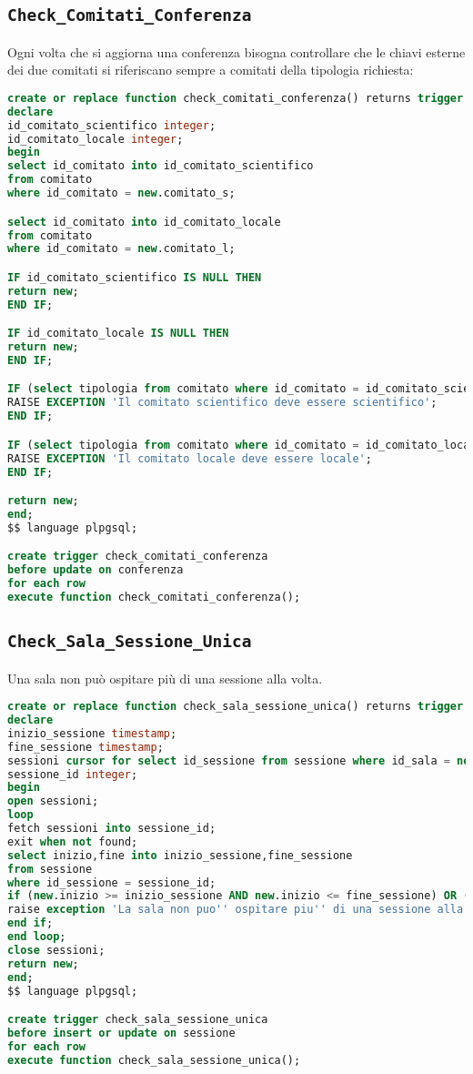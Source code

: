 \subsection{\texttt{Check\_Comitati\_Conferenza}}
Ogni volta che si aggiorna una conferenza bisogna controllare che le chiavi esterne dei due comitati si riferiscano sempre a comitati della tipologia richiesta:
\begin{lstlisting}[language=SQL, caption={\texttt{check\_comitati\_conferenza}},style=mystyle]
create or replace function check_comitati_conferenza() returns trigger as $$
declare 
id_comitato_scientifico integer;
id_comitato_locale integer;
begin
select id_comitato into id_comitato_scientifico
from comitato
where id_comitato = new.comitato_s;

select id_comitato into id_comitato_locale
from comitato
where id_comitato = new.comitato_l;

IF id_comitato_scientifico IS NULL THEN
return new;
END IF;

IF id_comitato_locale IS NULL THEN
return new;
END IF;

IF (select tipologia from comitato where id_comitato = id_comitato_scientifico) <> 'scientifico' THEN
RAISE EXCEPTION 'Il comitato scientifico deve essere scientifico';
END IF;

IF (select tipologia from comitato where id_comitato = id_comitato_locale) <> 'locale' THEN
RAISE EXCEPTION 'Il comitato locale deve essere locale';
END IF;

return new;
end;
$$ language plpgsql;

create trigger check_comitati_conferenza
before update on conferenza
for each row
execute function check_comitati_conferenza();
\end{lstlisting}
\subsection{\texttt{Check\_Sala\_Sessione\_Unica}}
Una sala non può ospitare più di una sessione alla volta.
\begin{lstlisting}[caption={\texttt{Check\_sala\_sessione\_unica}}, language=SQL, style=mystyle]
create or replace function check_sala_sessione_unica() returns trigger as $$
declare
inizio_sessione timestamp;
fine_sessione timestamp;
sessioni cursor for select id_sessione from sessione where id_sala = new.id_sala;
sessione_id integer;
begin
open sessioni;
loop
fetch sessioni into sessione_id;
exit when not found;
select inizio,fine into inizio_sessione,fine_sessione
from sessione
where id_sessione = sessione_id;
if (new.inizio >= inizio_sessione AND new.inizio <= fine_sessione) OR (new.fine >= inizio_sessione AND new.fine <= fine_sessione) then
raise exception 'La sala non puo'' ospitare piu'' di una sessione alla volta';
end if;
end loop;
close sessioni;
return new;
end;
$$ language plpgsql;

create trigger check_sala_sessione_unica
before insert or update on sessione
for each row
execute function check_sala_sessione_unica();
\end{lstlisting}
